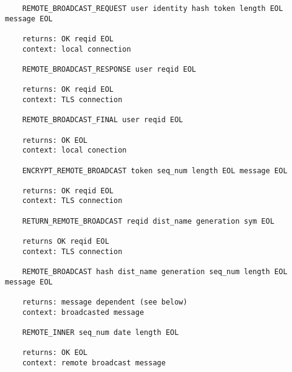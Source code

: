 \documentclass[letterpaper,11pt,oneside]{article}
\begin{document}
\vspace{10pt}
\begin{verbatim}
    REMOTE_BROADCAST_REQUEST user identity hash token length EOL message EOL

    returns: OK reqid EOL
    context: local connection

    REMOTE_BROADCAST_RESPONSE user reqid EOL 

    returns: OK reqid EOL
    context: TLS connection

    REMOTE_BROADCAST_FINAL user reqid EOL 

    returns: OK EOL
    context: local conection

    ENCRYPT_REMOTE_BROADCAST token seq_num length EOL message EOL

    returns: OK reqid EOL
    context: TLS connection

    RETURN_REMOTE_BROADCAST reqid dist_name generation sym EOL

    returns OK reqid EOL
    context: TLS connection

    REMOTE_BROADCAST hash dist_name generation seq_num length EOL message EOL

    returns: message dependent (see below)
    context: broadcasted message
    
    REMOTE_INNER seq_num date length EOL

    returns: OK EOL
    context: remote broadcast message
\end{verbatim}
\end{document}

